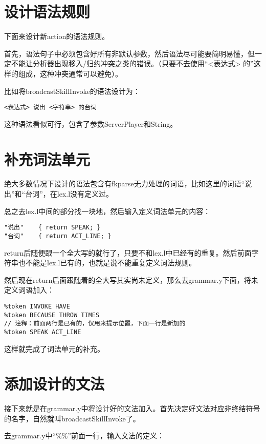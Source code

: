 \section{设计语法规则}

下面来设计新action的语法规则。

首先，语法句子中必须包含好所有非默认参数，然后语法尽可能要简明易懂，但一定不能让分析器出现移入/归约冲突之类的错误。（只要不去使用“<表达式> 的”这样的组成，这种冲突通常可以避免）。

比如将broadcastSkillInvoke的语法设计为：

\begin{verbatim}
<表达式> 说出 <字符串> 的台词
\end{verbatim}

这种语法看似可行，包含了参数ServerPlayer和String。

\section{补充词法单元}

绝大多数情况下设计的语法包含有fkparse无力处理的词语，比如这里的词语“说出”和“台词”，在lex.l没有定义过。

总之去lex.l中间的部分找一块地，然后输入定义词法单元的内容：

\begin{verbatim}
"说出"    { return SPEAK; }
"台词"    { return ACT_LINE; }
\end{verbatim}

return后随便跟一个全大写的就行了，只要不和lex.l中已经有的重复。然后前面字符串也不能是lex.l已有的，也就是说不能重复定义词法规则。

然后现在return后面跟随着的全大写其实尚未定义，那么去grammar.y下面，将未定义词语加入：

\begin{verbatim}
%token INVOKE HAVE
%token BECAUSE THROW TIMES
// 注释：前面两行是已有的，仅用来提示位置，下面一行是新加的
%token SPEAK ACT_LINE
\end{verbatim}

这样就完成了词法单元的补充。

\section{添加设计的文法}

接下来就是在grammar.y中将设计好的文法加入。首先决定好文法对应非终结符号的名字，自然就叫broadcastSkillInvoke了。

去grammar.y中“\%\%”前面一行，输入文法的定义：

